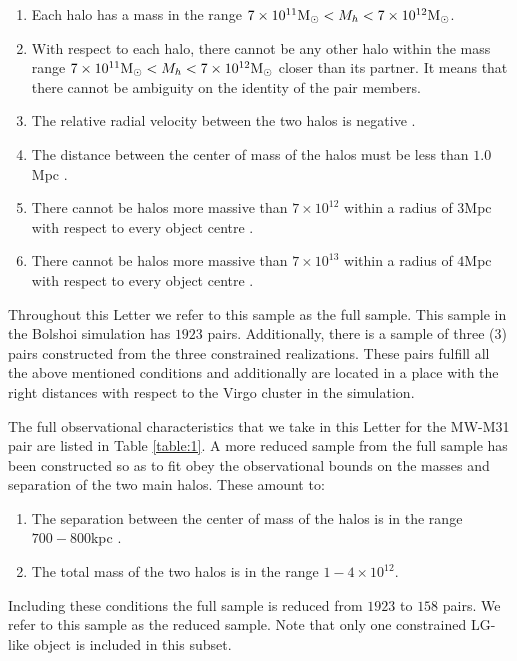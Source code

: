 \documentclass{emulateapj}
\newcommand{\Msun}{{\ifmmode{{\rm {M_{\odot}}}}\else{${\rm{M_{\odot}}}$}\fi}}
\begin{document}
\begin{enumerate}
\item Each halo has a mass in the range $7\times10^{11}\Msun
  <M_{h}<7\times 10^{12}\Msun$. 
\item With respect to each halo, there cannot be any other halo within
  the mass range $7\times10^{11}\Msun <M_{h}<7\times 10^{12}\Msun$
  closer than its partner. It means that there cannot be ambiguity on
  the identity of the pair members. 
\item The relative radial velocity between the two halos is negative
  \citep{vanderMarel12}. 
\item The distance between the center of mass of the halos must be
  less than $1.0$Mpc \citep{ribas05,vanderMarel08}. 
\item There cannot be halos more massive than $7\times 10^{12}$\Msun
  within a radius of $3$Mpc with respect to every object centre
  \citep{Karachentsev04,Anton09}. 
\item There cannot be halos more massive than $7\times 10^{13}$\Msun
  within  a radius of $4$Mpc with respect to every object centre
  \citep{Karachentsev04}. 
\end{enumerate}

Throughout this Letter we refer to this sample as the full
sample. 
This sample in the Bolshoi simulation has $1923$ pairs. Additionally,
there is a sample of three (3) pairs constructed from the three
constrained realizations. These pairs fulfill all the above mentioned
conditions and additionally are located in a place with the right
distances with respect to the Virgo cluster in the simulation. 




The full observational characteristics that we take in this Letter for
the MW-M31 pair are listed in Table \ref{table:1}.  
A more reduced sample from the full sample has been constructed
so as to fit obey the observational bounds on the masses and
separation of the two main halos. These amount to:   
\begin{enumerate}
\item The separation between the center of mass of the halos is in the
  range $700-800$kpc \citep{ribas05,vanderMarel08}. 
\item The total mass of the two halos is in the range $1-4\times
  10^{12}$\Msun \citep{vanderMarel12}. 
\end{enumerate}

Including these conditions the full sample is reduced from $1923$
to $158$ pairs. We refer to this sample as the reduced sample. Note
that only one constrained LG-like object is included in this subset.
\end{document}
